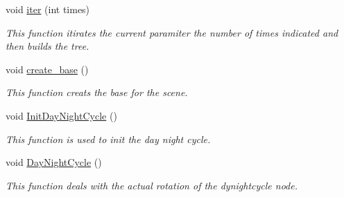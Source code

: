 \begin{DoxyCompactItemize}
void \hyperlink{classoctet_1_1_maths___l___systems_aa00aaad8e6c5702c44cc2ffab631c4a8}{iter} (int times)
\begin{DoxyCompactList}\small\item\em This function itirates the current paramiter the number of times indicated and then builds the tree. \end{DoxyCompactList}\item 
void \hyperlink{classoctet_1_1_maths___l___systems_adbd8eaa9e35cc2ff4679bab1be952af9}{create\+\_\+base} ()
\begin{DoxyCompactList}\small\item\em This function creats the base for the scene. \end{DoxyCompactList}\item 
void \hyperlink{classoctet_1_1_maths___l___systems_a8f2e60ebe4f860361a4f99357d4fb240}{Init\+Day\+Night\+Cycle} ()
\begin{DoxyCompactList}\small\item\em This function is used to init the day night cycle. \end{DoxyCompactList}\item 
void \hyperlink{classoctet_1_1_maths___l___systems_adcc1d9dedb89366b1075b72ad79e972b}{Day\+Night\+Cycle} ()
\begin{DoxyCompactList}\small\item\em This function deals with the actual rotation of the dynightcycle node. \end{DoxyCompactList}\end{DoxyCompactItemize}
